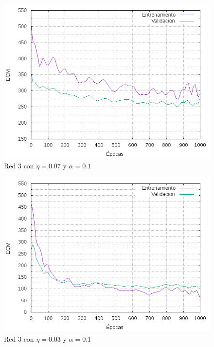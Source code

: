\begin{figure}[H]
  \includegraphics[width=125mm]{imagenes/ej1/ex_2-1_red_11-6-6-9-1_errors.png}
  \caption{Red 3 con $\eta = 0.07$ y $  \alpha = 0.1$}
\end{figure}

\begin{figure}[H]
  \includegraphics[width=125mm]{imagenes/ej1/ex_2-2_red_11-6-6-9-1_errors.png}
  \caption{Red 3 con $\eta = 0.03 $ y $ \alpha = 0.1$}
\end{figure}


